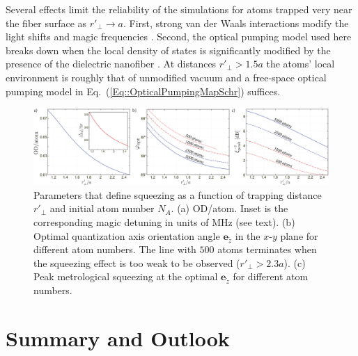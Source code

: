 \documentclass[preprint, aps,pra,onecolumn]{revtex4-1} %
\newcommand{\erf}[1]{Eq.~(\ref{#1})}
\newcommand{\qaxis}{\mathbf{e}_{\tilde{z}}}
\begin{document}
Several effects limit the reliability of the simulations for atoms trapped very near the fiber surface as $r'\!_\perp \rightarrow a$. 
First, strong van der Waals interactions modify the light shifts and magic frequencies \cite{vetsch_eugen_optical_2010, lacroute_state-insensitive_2012}.  
Second, the optical pumping model used here breaks down when the local density of states is significantly modified by the presence of the dielectric nanofiber \cite{le_kien_spontaneous_2005, le_kien_scattering_2006}. 
At distances $r'\!_\perp > 1.5a$ the atoms' local environment is roughly that of unmodified vacuum \cite{le_kien_spontaneous_2005} and a free-space optical pumping model in \erf{Eq::OpticalPumpingMapSchr} suffices. 


\begin{figure}[t]\includegraphics[scale=0.4]{./Fig6}
\caption{Parameters that define squeezing as a function of trapping distance $r'_\perp$ and initial atom number $N_A$. (a) OD/atom. Inset is the corresponding magic detuning in units of MHz (see text).
(b) Optimal quantization axis orientation angle $\qaxis$ in the $x$-$y$ plane for different atom numbers. 
The line with $ 500 $ atoms terminates when the squeezing effect is too weak to be observed ($ r'\!_\perp>2.3a $).
(c) Peak metrological squeezing at the optimal $\qaxis$ for different atom numbers.} \label{Fig::Squeezing_Distance}
\end{figure}


\section{Summary and Outlook} \label{Sec::Conclusion}
\end{document}
